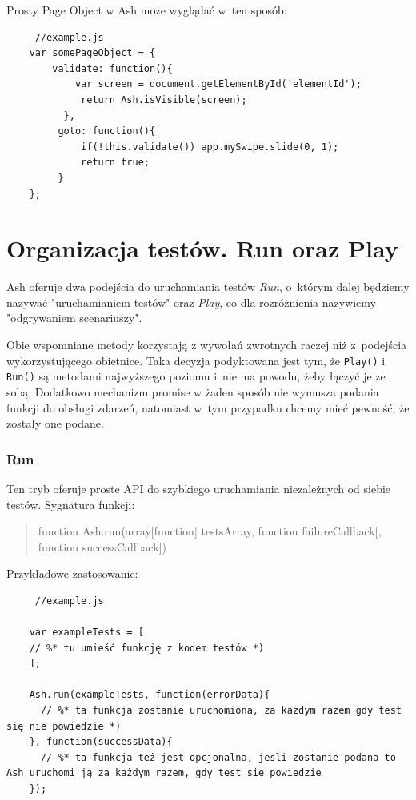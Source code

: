 \documentclass[brudnopis]{xmgr}
\begin{document}
Prosty Page Object w Ash może wyglądać w~ten sposób:

\begin{lstlisting}
     //example.js
    var somePageObject = {
    	validate: function(){
      	    var screen = document.getElementById('elementId');
             return Ash.isVisible(screen);
          },
         goto: function(){
             if(!this.validate()) app.mySwipe.slide(0, 1);
             return true;
         }
    };
\end{lstlisting}

\section{Organizacja testów. Run oraz Play}

Ash oferuje dwa podejścia do uruchamiania testów \textit{Run}, o~którym dalej będziemy nazywać "uruchamianiem testów" oraz \textit{Play}, co dla rozróżnienia nazywiemy "odgrywaniem scenariuszy".

Obie wspomniane metody korzystają z wywołań zwrotnych raczej niż z~podejścia wykorzystującego obietnice. Taka decyzja podyktowana jest tym, że \texttt{Play()} i \texttt{Run()} są metodami najwyższego poziomu i~nie ma powodu, żeby łączyć je ze sobą. Dodatkowo mechanizm promise w żaden sposób nie wymusza podania funkcji do obsługi zdarzeń, natomiast w~tym przypadku chcemy mieć pewność, że zostały one podane.  

\subsubsection{Run}

Ten tryb oferuje proste API do szybkiego uruchamiania niezależnych od siebie testów. Sygnatura funkcji: 

\begin{quote}
function Ash.run(array[function] testsArray, function failureCallback[, function successCallback]) 
\end{quote}

Przykładowe zastosowanie: 

\begin{lstlisting}
     //example.js

    var exampleTests = [
	// %* tu umieść funkcję z kodem testów *)
    ];

    Ash.run(exampleTests, function(errorData){
      // %* ta funkcja zostanie uruchomiona, za każdym razem gdy test się nie powiedzie *)
    }, function(successData){
      // %* ta funkcja też jest opcjonalna, jesli zostanie podana to Ash uruchomi ją za każdym razem, gdy test się powiedzie
    });
\end{lstlisting}
\end{document}
